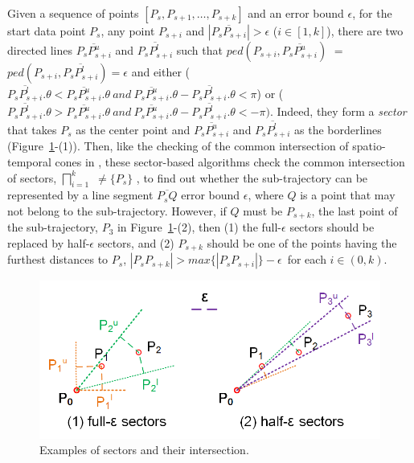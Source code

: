 Given a sequence of points $[P_{s}, P_{s+1}, \ldots, P_{s+k}]$ and an error bound $\epsilon$,
for the start data point $P_s$, any point $P_{s+i}$ and $|\overline{P_sP_{s+i}}|>\epsilon$ ($i\in[1, k]$), there are two directed lines $\overline{P_sP^u_{s+i}}$ and $\overline{P_sP^l_{s+i}}$ such that $ped(P_{s+i}, \overline{P_sP^u_{s+i}})$ $=$ $ped(P_{s+i}, \overline{P_sP^l_{s+i}}) = \epsilon$ and either ($\overline{P_sP^l_{s+i}}.\theta < \overline{P_sP^u_{s+i}}.\theta ~and~\overline{P_sP^u_{s+i}}.\theta - \overline{P_sP^l_{s+i}}.\theta <\pi$) or ($\overline{P_sP^l_{s+i}}.\theta > \overline{P_sP^u_{s+i}}.\theta ~and~ \overline{P_sP^u_{s+i}}.\theta - \overline{P_sP^l_{s+i}}.\theta < -\pi)$. Indeed, they form a \emph{sector}  that takes $P_s$ as the center point and $\overline{P_sP^u_{s+i}}$ and $\overline{P_sP^l_{s+i}}$ as the borderlines (Figure~\ref{fig:sleeve}-(1)).
%
Then, like the checking of the common intersection of spatio-temporal cones in \cised, these sector-based algorithms check the common intersection of sectors, \ie $\bigsqcap_{i=1}^{k}$ $\ne \{P_s\}$ \cite{Williams:Longest, Sklansky:Cone,Zhao:Sleeve}, to find out whether the sub-trajectory can be represented by a line segment $\overline{P_sQ}$ \wrt error bound $\epsilon$, where $Q$ is a point that may not belong to the sub-trajectory. However, if $Q$ must be $P_{s+k}$, the last point of the sub-trajectory, \eg $P_3$ in Figure~\ref{fig:sleeve}-(2), then (1) the full-$\epsilon$ sectors should be replaced by half-$\epsilon$ sectors, and (2) $P_{s+k}$ should be one of the points having the furthest distances to $P_s$, \ie $|P_sP_{s+k}| > max\{|P_sP_{s+i}|\} - \epsilon$~for each $i \in (0, k)$. 
%

\begin{figure}[tb!]
	\centering
	\includegraphics[scale=1.0]{figures/Fig-Sleeve.png}
	\vspace{-2ex}
	\caption{\small Examples of sectors and their intersection.}
	\vspace{-2ex}
	\label{fig:sleeve}
\end{figure}


